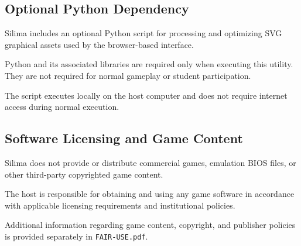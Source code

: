 \subsection{Optional Python Dependency}

Silima includes an optional Python script for processing
and optimizing SVG graphical assets used by the browser-based
interface.

Python and its associated libraries are required only when
executing this utility. They are not required for normal
gameplay or student participation.

The script executes locally on the host computer and does
not require internet access during normal execution.

\subsection{Software Licensing and Game Content}

Silima does not provide or distribute commercial games,
emulation BIOS files, or other third-party copyrighted
game content.

The host is responsible for obtaining and using any game
software in accordance with applicable licensing requirements
and institutional policies.

Additional information regarding game content, copyright,
and publisher policies is provided separately in
\texttt{FAIR-USE.pdf}.
